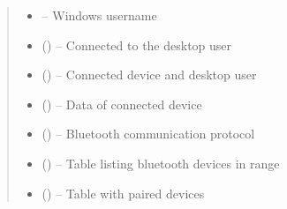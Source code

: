\documentclass[letterpaper,10pt,english]{sphinxmanual}
\begin{document}
\begin{savenotes}
\begin{fulllineitems}
\begin{quote}
\begin{description}
\begin{itemize}
\item {} 
\sphinxAtStartPar
{} – Windows username

\item {} 
\sphinxAtStartPar
{} () – Connected to the desktop user

\item {} 
\sphinxAtStartPar
{} () – Connected device and desktop user

\item {} 
\sphinxAtStartPar
{} ({\hyperref[\detokenize{eezz:eezz.table.TTableRow}]{}}) – Data of connected device

\item {} 
\sphinxAtStartPar
{} ({\hyperref[\detokenize{eezz:eezz.blueserv.TBluetoothService}]{}}) – Bluetooth communication protocol

\item {} 
\sphinxAtStartPar
{} ({\hyperref[\detokenize{eezz:eezz.table.TTable}]{}}) – Table listing bluetooth devices in range

\item {} 
\sphinxAtStartPar
{} ({\hyperref[\detokenize{eezz:eezz.table.TTable}]{}}) – Table with paired devices

\end{itemize}

\end{description}\end{quote}


\end{fulllineitems}
\end{savenotes}
\end{document}
